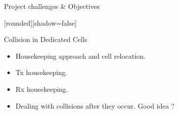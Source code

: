 \begin{withoutheadline}
\begin{frame}{Project challenges \& Objectives}


[rounded][shadow=false]
\begin{minipage}[t]{0.48\linewidth}

\begin{block}{Collision in Dedicated Cells}
    \begin{itemize}
    \item Housekeeping approach and cell relocation.
    \item Tx housekeeping. 
    \item<4-> Rx housekeeping. 
    \item<6-> Dealing with collisions after they occur. Good idea ?
    

\end{itemize}
\end{block}
\end{minipage}
\end{frame}
\end{withoutheadline}
